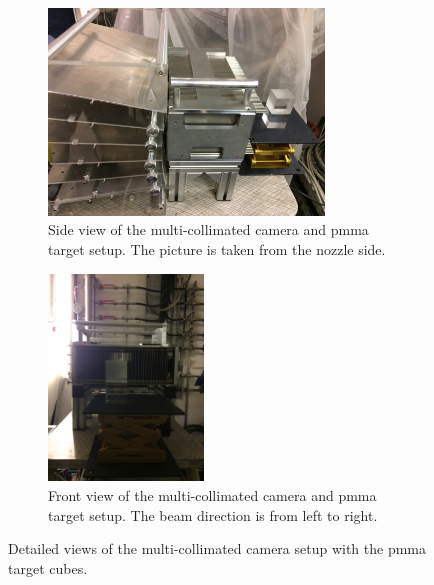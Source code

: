 \begin{figure}[!htbp]
\begin{subfigure}[t]{.5\textwidth}
\centering
\includegraphics[width=1.\textwidth, height=5.5cm]{03_GraphicFiles/chapter6_BeamTests/Nice_September2018/Target_Coll_Abs_side.jpg}
\caption{Side view of the multi-collimated camera and \gls{pmma} target setup. The picture is taken from the nozzle side.}
\label{chap6::fig::September_SetupPicture}
\end{subfigure}
\begin{subfigure}[t]{.5\textwidth}
\centering
\includegraphics[width=1.\textwidth, trim = {0 20cm 0 30cm}, clip, height=5.5cm]{03_GraphicFiles/chapter6_BeamTests/Nice_September2018/Target_Coll_Abs_front.jpg}	
\caption{Front view of the multi-collimated camera and \gls{pmma} target setup. The beam direction is from left to right.}
\label{chap6::fig::September_SetupPicture2}
\end{subfigure}
\caption{Detailed views of the multi-collimated camera setup with the \gls{pmma} target cubes.}
\label{chap6::fig::September_SetupCameraDetails}
\end{figure}

